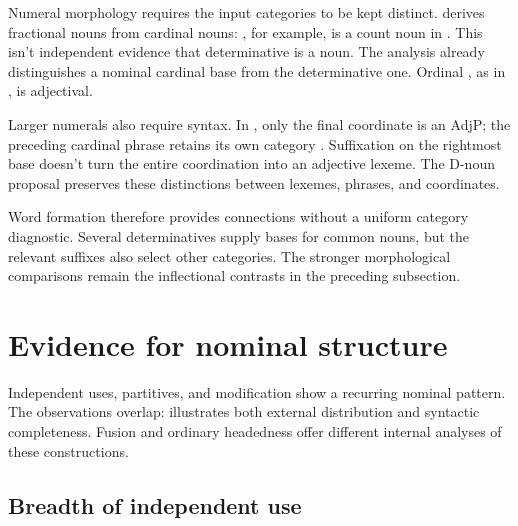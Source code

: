 \documentclass[12pt]{article}
\begin{document}
Numeral morphology requires the input categories to be kept distinct. \textcite[§5.4]{reynolds2026numerals} derives fractional nouns from cardinal nouns: , for example, is a count noun in . This isn't independent evidence that determinative  is a noun. The analysis already distinguishes a nominal cardinal base from the determinative one. Ordinal , as in , is adjectival.

Larger numerals also require syntax. In , only the final coordinate is an AdjP; the preceding cardinal phrase retains its own category \citep[§5.5]{reynolds2026numerals}. Suffixation on the rightmost base doesn't turn the entire coordination into an adjective lexeme. The D-noun proposal preserves these distinctions between lexemes, phrases, and coordinates.

Word formation therefore provides connections without a uniform category diagnostic. Several determinatives supply bases for common nouns, but the relevant suffixes also select other categories. The stronger morphological comparisons remain the inflectional contrasts in the preceding subsection.

\section{Evidence for nominal structure}\label{sec:evidence}

Independent uses, partitives, and modification show a recurring nominal pattern. The observations overlap:  illustrates both external distribution and syntactic completeness. Fusion and ordinary headedness offer different internal analyses of these constructions.

\subsection{Breadth of independent use}\label{sec:independent}
\end{document}
